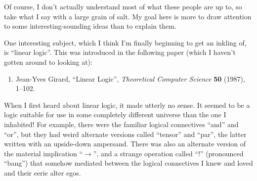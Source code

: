 \documentclass{article}
\def\tightlist{}
\begin{document}
Of course, I don't actually understand most of what these people are up
to, so take what I say with a large grain of salt. My goal here is more
to draw attention to some interesting-sounding ideas than to explain
them.

One interesting subject, which I think I'm finally beginning to get an
inkling of, is ``linear logic''. This was introduced in the following
paper (which I haven't gotten around to looking at):

\begin{enumerate}
\def\labelenumi{\arabic{enumi})}
\tightlist
\item
  Jean-Yves Girard,  ``Linear Logic'', \emph{Theoretical Computer
  Science} \textbf{50} (1987), 1--102.
\end{enumerate}

When I first heard about linear logic, it made utterly no sense. It
seemed to be a logic suitable for use in some completely different
universe than the one I inhabited! For example, there were the familiar
logical connectives ``and'' and ``or'', but they had weird alternate
versions called ``tensor'' and ``par'', the latter written with an
upside-down ampersand. There was also an alternate version of the
material implication ``\(\to\)'', and a strange operation called
``\(!\)'' (pronounced ``bang'') that somehow mediated between the
logical connectives I knew and loved and their eerie alter egos.
\end{document}
